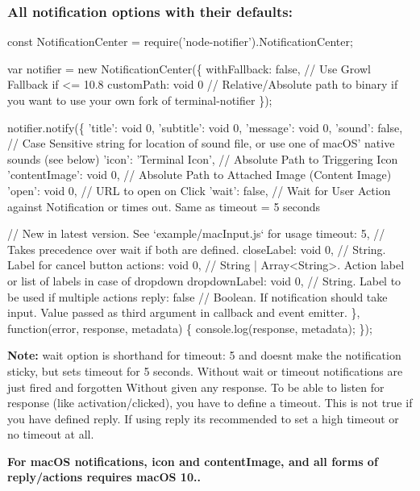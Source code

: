 \subsubsection*{All notification options with their defaults\+:}


\begin{DoxyCode}
const NotificationCenter = require('node-notifier').NotificationCenter;

var notifier = new NotificationCenter(\{
  withFallback: false, // Use Growl Fallback if <= 10.8
  customPath: void 0 // Relative/Absolute path to binary if you want to use your own fork of
       terminal-notifier
\});

notifier.notify(\{
  'title': void 0,
  'subtitle': void 0,
  'message': void 0,
  'sound': false, // Case Sensitive string for location of sound file, or use one of macOS' native sounds
       (see below)
  'icon': 'Terminal Icon', // Absolute Path to Triggering Icon
  'contentImage': void 0, // Absolute Path to Attached Image (Content Image)
  'open': void 0, // URL to open on Click
  'wait': false, // Wait for User Action against Notification or times out. Same as timeout = 5 seconds

  // New in latest version. See `example/macInput.js` for usage
  timeout: 5, // Takes precedence over wait if both are defined.
  closeLabel: void 0, // String. Label for cancel button
  actions: void 0, // String | Array<String>. Action label or list of labels in case of dropdown
  dropdownLabel: void 0, // String. Label to be used if multiple actions
  reply: false // Boolean. If notification should take input. Value passed as third argument in callback
       and event emitter.
\}, function(error, response, metadata) \{
  console.log(response, metadata);
\});
\end{DoxyCode}


{\bfseries Note\+:} {\ttfamily wait} option is shorthand for {\ttfamily timeout\+: 5} and doesn\textquotesingle{}t make the notification sticky, but sets timeout for 5 seconds. Without {\ttfamily wait} or {\ttfamily timeout} notifications are just fired and forgotten Without given any response. To be able to listen for response (like activation/clicked), you have to define a timeout. This is not true if you have defined {\ttfamily reply}. If using {\ttfamily reply} it\textquotesingle{}s recommended to set a high timeout or no timeout at all.

{\bfseries For mac\+OS notifications, icon and content\+Image, and all forms of reply/actions requires mac\+OS 10..}

